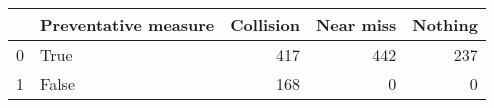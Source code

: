 \begin{tabular}{llrrr}
\toprule
{} &  Preventative measure &  Collision &  Near miss &  Nothing \\
\midrule
0 &                  True &        417 &        442 &      237 \\
1 &                 False &        168 &          0 &        0 \\
\bottomrule
\end{tabular}

